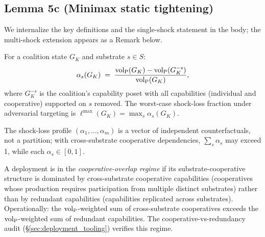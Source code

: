 \subsection{Lemma 5c (Minimax static tightening)}
\label{sec:lem5c}

We internalize the key definitions and the single-shock statement
in the body; the multi-shock extension appears as a Remark below.

\begin{definition}
\label{def:loss_fraction}
For a coalition state $G_K$ and substrate $s \in S$:
\[
  \alpha_s(G_K) \;=\; \frac{{\operatorname{vol}_{\mathrm{P}}}(G_K) - {\operatorname{vol}_{\mathrm{P}}}(G_K^{-s})}{{\operatorname{vol}_{\mathrm{P}}}(G_K)},
\]
where $G_K^{-s}$ is the coalition's capability poset with all
capabilities (individual and cooperative) supported on $s$ removed.
The worst-case shock-loss fraction under adversarial targeting is
$\ell^{\max}(G_K) = \max_s \alpha_s(G_K)$.

The shock-loss profile $(\alpha_1, \ldots, \alpha_m)$ is a vector of
independent counterfactuals, not a partition; with cross-substrate
cooperative dependencies, $\sum_s \alpha_s$ may exceed 1, while each
$\alpha_s \in [0, 1]$.
\end{definition}

\begin{definition}
\label{def:coop_overlap}
A deployment is in the \emph{cooperative-overlap regime} if its
substrate-cooperative structure is dominated by cross-substrate
cooperative capabilities (cooperatives whose production requires
participation from multiple distinct substrates) rather than by
redundant capabilities (capabilities replicated across substrates).
Operationally: the ${\operatorname{vol}_{\mathrm{P}}}$-weighted sum of cross-substrate
cooperatives exceeds the ${\operatorname{vol}_{\mathrm{P}}}$-weighted sum of redundant
capabilities. The cooperative-vs-redundancy audit
(\S\ref{sec:deployment_tooling}) verifies this regime.
\end{definition}

